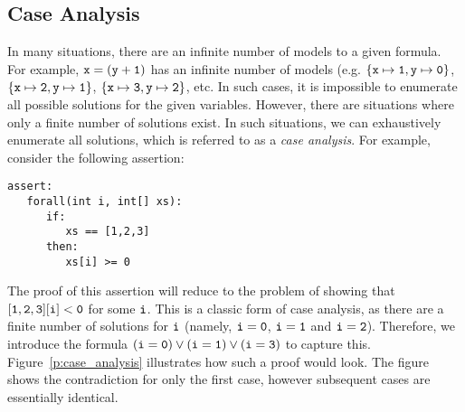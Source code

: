 \subsection{Case Analysis}

In many situations, there are an infinite number of models to a given
formula.  For example, ${\tt x = (y + 1)}$ has an infinite number of
models (e.g. ${\tt\{x\mapsto 1, y\mapsto 0\}}$,
${\tt\{x\mapsto 2, y\mapsto 1\}}$, ${\tt\{x\mapsto 3, y\mapsto 2\}}$, etc.
In such cases, it is impossible to enumerate all possible solutions
for the given variables.  However, there are situations where only a
finite number of solutions exist.  In such situations, we can
exhaustively enumerate all solutions, which is referred to as a {\em
  case analysis}.  For example, consider the following assertion:

\begin{tcolorbox}\begin{lstlisting}[language=WyAL]
assert:
   forall(int i, int[] xs):
      if:
         xs == [1,2,3]
      then:
         xs[i] >= 0
\end{lstlisting}\end{tcolorbox}

The proof of this assertion will reduce to the problem of showing that
${\tt [1,2,3][i] < 0}$ for some ${\tt i}$.  This is a classic form of
case analysis, as there are a finite number of solutions for ${\tt i}$
(namely, ${\tt i=0}$, ${\tt i=1}$ and ${\tt i=2}$).  Therefore, we
introduce the formula ${\tt (i=0)\lor(i=1)\lor(i=3)}$ to capture
this.  Figure~\ref{p:case_analysis} illustrates how such a proof would
look.  The figure shows the contradiction for only the first case,
however subsequent cases are essentially identical.

